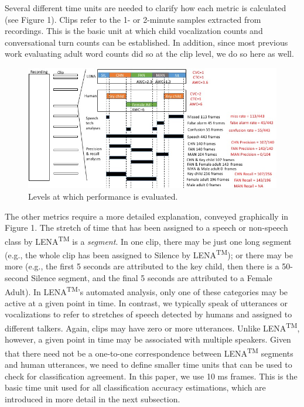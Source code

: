 \documentclass[english,floatsintext,man]{apa6}
\begin{document}
Several different time units are needed to clarify how each metric is
calculated (see Figure 1). Clips refer to the 1- or 2-minute samples
extracted from recordings. This is the basic unit at which child
vocalization counts and conversational turn counts can be established.
In addition, since most previous work evaluating adult word counts did
so at the clip level, we do so here as well.

\begin{figure}
\centering
\includegraphics{fig_levels.jpg}
\caption{Levels at which performance is evaluated.}
\end{figure}

The other metrics require a more detailed explanation, conveyed
graphically in Figure 1. The stretch of time that has been assigned to a
speech or non-speech class by LENA\textsuperscript{TM} is a
\emph{segment}. In one clip, there may be just one long segment (e.g.,
the whole clip has been assigned to Silence by
LENA\textsuperscript{TM}); or there may be more (e.g., the first 5
seconds are attributed to the key child, then there is a 50-second
Silence segment, and the final 5 seconds are attributed to a Female
Adult). In LENA\textsuperscript{TM}'s automated analysis, only one of
these categories may be active at a given point in time. In contrast, we
typically speak of utterances or vocalizations to refer to stretches of
speech detected by humans and assigned to different talkers. Again,
clips may have zero or more utterances. Unlike LENA\textsuperscript{TM},
however, a given point in time may be associated with multiple speakers.
Given that there need not be a one-to-one correspondence between
LENA\textsuperscript{TM} segments and human utterances, we need to
define smaller time units that can be used to check for classification
agreement. In this paper, we use 10 ms frames. This is the basic time
unit used for all classification accuracy estimations, which are
introduced in more detail in the next subsection.
\end{document}
